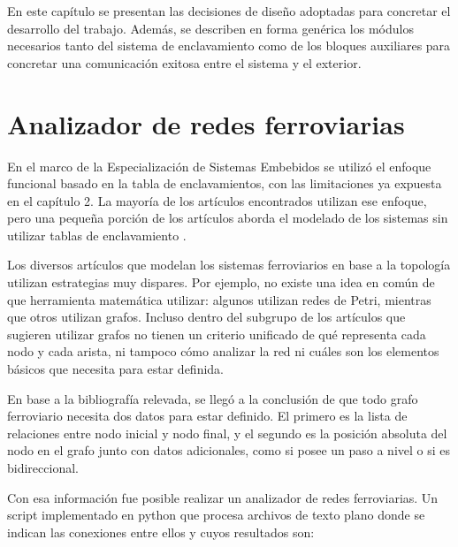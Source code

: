 En este capítulo se presentan las decisiones de diseño adoptadas para concretar el desarrollo del trabajo. Además, se describen en forma genérica los módulos necesarios tanto del sistema de enclavamiento como de los bloques auxiliares para concretar una comunicación exitosa entre el sistema y el exterior.

\section{Analizador de redes ferroviarias}

	En el marco de la Especialización de Sistemas Embebidos se utilizó el enfoque funcional basado en la tabla de enclavamientos, con las limitaciones ya expuesta en el capítulo 2. La mayoría de los artículos encontrados utilizan ese enfoque\citep{FUNCIONAL}, pero una pequeña porción de los artículos aborda el modelado de los sistemas sin utilizar tablas de enclavamiento \citep{GEOGRAFICO}.
	
	Los diversos artículos que modelan los sistemas ferroviarios en base a la topología utilizan estrategias muy dispares. Por ejemplo, no existe una idea en común de que herramienta matemática utilizar: algunos utilizan redes de Petri, mientras que otros utilizan grafos. Incluso dentro del subgrupo de los artículos que sugieren utilizar grafos no tienen un criterio unificado de qué representa cada nodo y cada arista, ni tampoco cómo analizar la red ni cuáles son los elementos básicos que necesita para estar definida.	
	
	En base a la bibliografía relevada, se llegó a la conclusión de que todo grafo ferroviario necesita dos datos para estar definido. El primero es la lista de relaciones entre nodo inicial y nodo final, y el segundo es la posición absoluta del nodo en el grafo junto con datos adicionales, como si posee un paso a nivel o si es bidireccional. 
	
	Con esa información fue posible realizar un analizador de redes ferroviarias. Un script implementado en python que procesa archivos de texto plano donde se indican las conexiones entre ellos y cuyos resultados son:
	
